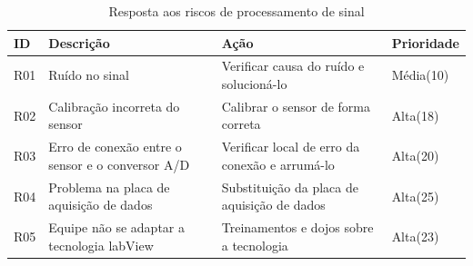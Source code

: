 \begin{table}[h]
    \centering
    \begin{tabular}{|p{1cm}|p{2cm}|p{4cm}|p{2cm}|}
        \hline
        \textbf{ID}  & \textbf{Descrição} & \textbf{Ação} & \textbf{Prioridade} \\ \hline
        R01 &Ruído no sinal &Verificar causa do ruído e solucioná-lo & Média(10) \\ \hline
        R02 &Calibração incorreta do sensor &Calibrar o sensor de forma correta &Alta(18) \\ \hline
        R03 &Erro de conexão entre o sensor e o conversor A/D &Verificar local de erro da conexão e arrumá-lo &Alta(20) \\ \hline
        R04 &Problema na placa de aquisição de dados &Substituição da placa de aquisição de dados &Alta(25) \\ \hline
        R05 &Equipe não se adaptar a tecnologia labView &Treinamentos e dojos sobre a tecnologia &Alta(23) \\ \hline
    \end{tabular}
\caption{Resposta aos riscos de processamento de sinal}
\end{table}